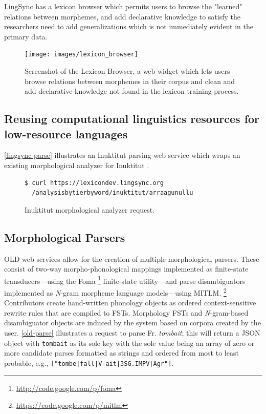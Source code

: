 \documentclass[11pt]{article}
\begin{document}
LingSync has a lexicon browser which permits users to browse the "learned"  relations between morphemes, and add declarative knowledge to satisfy the researchers need to add generalizations which is not immediately evident in the primary data.


\begin{figure}
\begin{center}
\texttt{[image: images/lexicon\_browser]}
\caption{Screenshot of the Lexicon Browser, a web widget which lets users browse relations between morphemes in their corpus and clean and add declarative knowledge not found in the lexicon training process.}
\label{lexicon_browser_screenshot}
\end{center}
\end{figure}



\subsection{Reusing computational linguistics resources for low-resource languages}

\autoref{lingsync-parse} illustrates an Inuktitut parsing web service which wraps an existing
morphological analyzer for Inuktitut \cite{Farley:2012:Online}.


\begin{figure}[h]
\scriptsize
\begin{verbatim}
$ curl https://lexicondev.lingsync.org
  /analysisbytierbyword/inuktitut/arraagunullu
\end{verbatim}
\normalsize
\caption{Inuktitut morphological analyzer request.}
\label{lingsync-parse}
\end{figure}



\subsection{Morphological Parsers}

OLD web services allow for the creation of multiple morphological parsers.
These consist of two-way morpho-phonological mappings implemented as
finite-state transducers---using the Foma%
\footnote{\url{http://code.google.com/p/foma}} %
finite-state utility---and parse disambiguators implemented as \textit{N}-gram
morpheme language models---using MITLM.%
\footnote{\url{https://code.google.com/p/mitlm}}
Contributors create hand-written phonology objects as ordered context-sensitive
rewrite rules that are compiled to FSTs. Morphology FSTs and \textit{N}-gram-based
disambiguator objects are induced by the system based on corpora created by the 
user. \autoref{old-parse} illustrates a request to parse Fr. \textit{tombait};
this will return a JSON object with \texttt{tombait} as its sole key with the 
sole value being an array of zero or more candidate parses formatted as strings and 
ordered from most to least probable, e.g., \texttt{["tombe|fall|V-ait|3SG.IMPV|Agr"]}.
\end{document}
